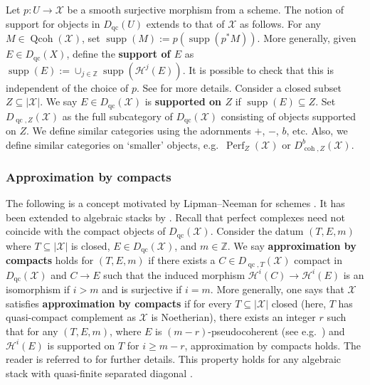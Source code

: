 \documentclass[11pt]{amsart}
\theoremstyle{plain}
\theoremstyle{definition}
\numberwithin{equation}{section}
\numberwithin{theorem}{section}
\begin{document}
Let $p \colon U \to \mathcal{X}$ be a smooth surjective morphism from a scheme. The notion of support for objects in $D_{\operatorname{qc}}(U)$ extends to that of $\mathcal{X}$ as follows. 
For any $M\in\operatorname{Qcoh}(\mathcal{X})$, set $\operatorname{supp}(M):= p(\operatorname{supp}(p^\ast M))$. 
More generally, given $E\in D_{\operatorname{qc}}(X)$, define the \textbf{support of $E$} as $\operatorname{supp}(E) := \cup_{j\in\mathbb{Z}} \operatorname{supp}(\mathcal{H}^j (E))$. 
It is possible to check that this is independent of the choice of $p$. See \cite[Section 4.3]{Hall/Rydh:2017} for more details. Consider a closed subset $Z\subseteq|\mathcal{X}|$. We say $E\in D_{\operatorname{qc}}(\mathcal{X})$ is \textbf{supported on $Z$} if $\operatorname{supp}(E)\subseteq Z$. Set $D_{\operatorname{qc},Z}(\mathcal{X})$ as the full subcategory of $D_{\operatorname{qc}}(\mathcal{X})$ consisting of objects supported on $Z$. We define similar categories using the adornments $+$, $-$, $b$, etc. Also, we define similar categories on `smaller' objects, e.g.\ $\operatorname{Perf}_Z (\mathcal{X})$ or $D^b_{\operatorname{coh},Z}(\mathcal{X})$.

\subsubsection{Approximation by compacts}
\label{sec:prelim_algebraic_stacks_approx}

The following is a concept motivated by Lipman--Neeman for schemes \cite{Lipman/Neeman:2007}. 
It has been extended to algebraic stacks by \cite{Hall/Lamarche/Lank/Peng:2025}. 
Recall that perfect complexes need not coincide with the compact objects of $D_{\operatorname{qc}}(\mathcal{X})$. 
Consider the datum $(T, E, m)$ where $T\subseteq|\mathcal{X}|$ is closed, $E\in D_{\operatorname{qc}}(\mathcal{X})$, and $m\in \mathbb{Z}$. 
We say \textbf{approximation by compacts} holds for $(T, E, m)$ if there exists a $C\in D_{\operatorname{qc},T}(\mathcal{X})$ compact in $D_{\operatorname{qc}}(\mathcal{X})$ and $C\to E$ such that the induced morphism $\mathcal{H}^i(C) \to \mathcal{H}^i(E)$ is an isomorphism if $i>m$ and is surjective if $i=m$. More generally, one says that $\mathcal{X}$ satisfies \textbf{approximation by compacts} if for every $T\subseteq |\mathcal{X}|$ closed (here, $T$ has quasi-compact complement as $\mathcal{X}$ is Noetherian), there exists an integer $r$ such that for any $(T, E, m)$, where $E$ is $(m-r)$-pseudocoherent (see e.g.\ \cite[\href{https://stacks.math.columbia.edu/tag/08FT}{Tag 08FT}]{stacks-project}) and $\mathcal{H}^{i}(E)$ is supported on $T$ for $i\geq m-r$, 
approximation by compacts holds. 
The reader is referred to \cite[$\S 3$]{Hall/Lamarche/Lank/Peng:2025} for further details. 
This property holds for any algebraic stack with quasi-finite separated diagonal \cite[Corollary 5.4]{Hall/Lamarche/Lank/Peng:2025}.
\end{document}
